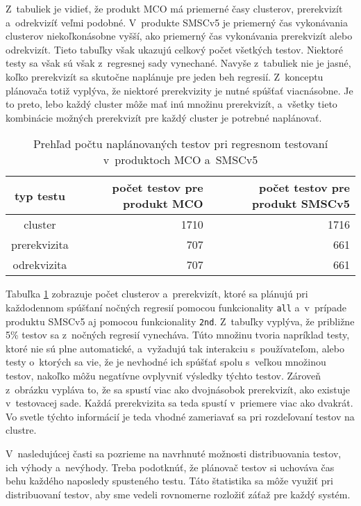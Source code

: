 Z~tabuliek je vidieť, že produkt MCO má priemerné časy clusterov, prerekvizít a~odrekvizíť veľmi podobné.
V~produkte SMSCv5 je priemerný čas vykonávania clusterov niekoľkonásobne vyšší, ako priemerný čas vykonávania prerekvizít alebo odrekvizít.
Tieto tabuľky však ukazujú celkový počet všetkých testov. Niektoré testy sa však sú však z~regresnej sady vynechané.
Navyše z~tabuliek nie je jasné, koľko prerekvizít sa skutočne naplánuje pre jeden beh regresií.
Z~konceptu plánovača totiž vyplýva, že niektoré prerekvizity je nutné spúšťať viacnásobne.
Je to preto, lebo každý cluster môže mať inú množinu prerekvizít, a~všetky tieto kombinácie možných prerekvizít pre každý cluster
je potrebné naplánovať.

\begin{table}
  \begin{center}
    \begin{tabular}{| c | r | r |}
    \hline
    typ testu  & počet testov pre produkt MCO & počet testov pre produkt SMSCv5 \\ \hline
    cluster      & 1710 & 1716 \\ \hline
    prerekvizita & 707  & 661  \\ \hline
    odrekvizita  & 707  & 661 \\
    \hline
    \end{tabular}
    \caption{Prehľad počtu naplánovaných testov pri regresnom testovaní v~produktoch MCO a~SMSCv5}
    \label{tabulka:pocet_naplanovanych_testov}
  \end{center}
\end{table}

Tabuľka \ref{tabulka:pocet_naplanovanych_testov} zobrazuje počet clusterov a~prerekvizít, ktoré sa plánujú
pri každodennom spúšťaní nočných regresií pomocou funkcionality \texttt{all} a~v~prípade produktu SMSCv5 aj
pomocou funkcionality \texttt{2nd}. Z~tabuľky vyplýva, že približne 5\% testov sa 
z~nočných regresií vynecháva. Túto množinu tvoria napríklad testy, ktoré nie sú plne automatické, a~vyžadujú tak interakciu s~používateľom,
alebo testy o~ktorých sa vie, že je nevhodné ich spúšťať spolu s~veľkou množinou testov, 
nakoľko môžu negatívne ovplyvniť výsledky týchto testov.
Zároveň z~obrázku vypláva to, že sa spustí viac ako dvojnásobok prerekvizít, ako existuje v~testovacej sade.
Každá prerekvizita sa teda spustí v~priemere viac ako dvakrát. 
Vo svetle týchto informácií je teda vhodné zameriavať sa pri rozdeľovaní testov na clustre.

V~nasledujúcej časti sa pozrieme na navrhnuté možnosti distribuovania testov, ich výhody a~nevýhody.
Treba podotknúť, že plánovač testov si uchováva čas behu každého naposledy spusteného testu.
Táto štatistika sa môže využiť pri distribuovaní testov, aby sme vedeli rovnomerne rozložiť záťaž pre každý systém.
